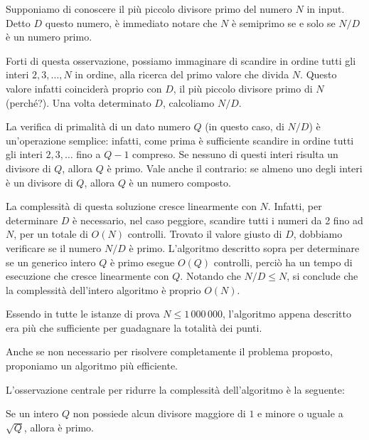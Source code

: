 

Supponiamo di conoscere il più piccolo divisore primo del numero $N$ in input. Detto $D$ questo numero, è immediato notare che  $N$ è semiprimo se e solo se $N/D$ è un numero primo.

\SolN
Forti di questa osservazione, possiamo immaginare di scandire in ordine tutti gli interi $2,3,\dots, N$ in ordine, alla ricerca del primo valore che divida $N$. Questo valore infatti coinciderà proprio con $D$, il più piccolo divisore primo di $N$ (perché?). Una volta determinato $D$, calcoliamo $N/D$.

La verifica di primalità di un dato numero $Q$ (in questo caso, di $N/D$) è un'operazione semplice: infatti, come prima è sufficiente scandire in ordine tutti gli interi $2, 3, \dots$ fino a $Q-1$ compreso. Se nessuno di questi interi risulta un divisore di $Q$, allora $Q$ è primo. Vale anche il contrario: se almeno uno degli interi è un divisore di $Q$, allora $Q$ è un numero composto.

La complessità di questa soluzione cresce linearmente con $N$. Infatti, per determinare $D$ è necessario, nel caso peggiore, scandire tutti i numeri da 2 fino ad $N$, per un totale di $O(N)$ controlli. Trovato il valore giusto di $D$, dobbiamo verificare se il numero $N/D$ è primo. L'algoritmo descritto sopra per determinare se un generico intero $Q$ è primo esegue $O(Q)$ controlli, perciò ha un tempo di esecuzione che cresce linearmente con $Q$. Notando che $N/D \le N$, si conclude che la complessità dell'intero algoritmo è proprio $O(N)$.

Essendo in tutte le istanze di prova $N \le 1\,000\,000$, l'algoritmo appena descritto era più che sufficiente per guadagnare la totalità dei punti.

\SolSqrtN

Anche se non necessario per risolvere completamente il problema proposto, proponiamo un algoritmo più efficiente.

L'osservazione centrale per ridurre la complessità dell'algoritmo è la seguente:

\begin{mdframed}[linewidth=3pt, linecolor=black!15!white, backgroundcolor=black!8!white]
\vspace{0mm}
    Se un intero $Q$ non possiede alcun divisore maggiore di $1$ e minore o uguale a $\sqrt{Q}$, allora è primo.

\end{mdframed}

